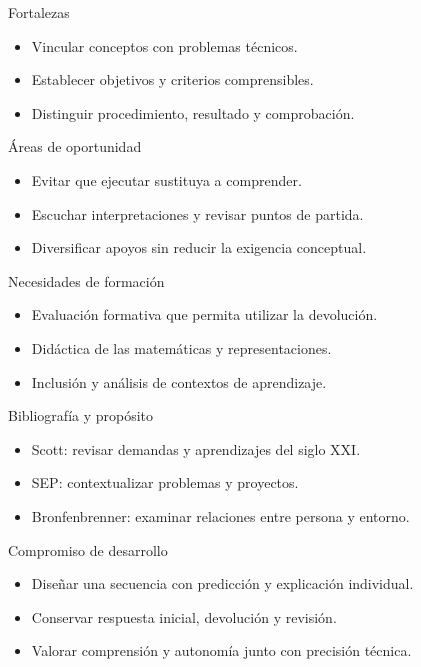 \documentclass[
	spanish,
	aspectratio=1610,
	xcolor={dvipsnames,table}
]{beamer}
\begin{document}
\begin{frame}{Fortalezas}
\fontsize{14}{18}\selectfont\begin{itemize}\setlength{\itemsep}{.45cm}
\item Vincular conceptos con problemas técnicos.
\item Establecer objetivos y criterios comprensibles.
\item Distinguir procedimiento, resultado y comprobación.
\end{itemize}
\end{frame}
\begin{frame}{Áreas de oportunidad}
\fontsize{14}{18}\selectfont\begin{itemize}\setlength{\itemsep}{.45cm}
\item Evitar que ejecutar sustituya a comprender.
\item Escuchar interpretaciones y revisar puntos de partida.
\item Diversificar apoyos sin reducir la exigencia conceptual.
\end{itemize}
\end{frame}
\begin{frame}{Necesidades de formación}
\fontsize{14}{18}\selectfont\begin{itemize}\setlength{\itemsep}{.45cm}
\item Evaluación formativa que permita utilizar la devolución.
\item Didáctica de las matemáticas y representaciones.
\item Inclusión y análisis de contextos de aprendizaje.
\end{itemize}
\end{frame}
\begin{frame}{Bibliografía y propósito}
\fontsize{14}{18}\selectfont\begin{itemize}\setlength{\itemsep}{.45cm}
\item Scott: revisar demandas y aprendizajes del siglo XXI.
\item SEP: contextualizar problemas y proyectos.
\item Bronfenbrenner: examinar relaciones entre persona y entorno.
\end{itemize}
\end{frame}
\begin{frame}{Compromiso de desarrollo}
\fontsize{14}{18}\selectfont\begin{itemize}\setlength{\itemsep}{.45cm}
\item Diseñar una secuencia con predicción y explicación individual.
\item Conservar respuesta inicial, devolución y revisión.
\item Valorar comprensión y autonomía junto con precisión técnica.
\end{itemize}
\end{frame}
\end{document}
